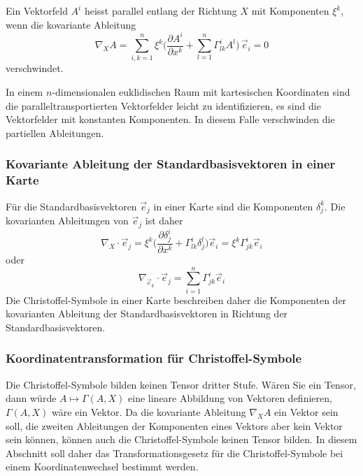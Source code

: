 \begin{definition}
%
%
Ein Vektorfeld $A^i$ heisst parallel entlang der Richtung
$X$ mit Komponenten $\xi^k$, wenn die kovariante Ableitung
\begin{equation*}
\nabla_X A
=
\sum_{i,k=1}^n
\xi^k
\biggl(
\frac{\partial A^i}{\partial x^k}
+
\sum_{l=1}^n
\Gamma^i_{lk} A^l
\biggr)
\,\vec{e}_i
= 0
\end{equation*}
verschwindet.
\end{definition}

In einem $n$-dimensionalen euklidischen Raum mit kartesischen Koordinaten
sind die paralleltransportierten Vektorfelder leicht zu identifizieren,
es sind die Vektorfelder mit konstanten Komponenten.
In diesem Falle verschwinden die partiellen Ableitungen.



%
%
\subsubsection{Kovariante Ableitung der Standardbasisvektoren in einer Karte}
Für die Standardbasisvektoren $\vec{e}_j$ in einer Karte sind die
Komponenten $\delta_j^k$.
Die kovarianten Ableitungen von $\vec{e}_j$ ist daher
\begin{equation}
\nabla_X\cdot \vec{e}_j
=
\xi^k
\biggl(
\frac{\partial \delta_j^i}{\partial x^k}
+
\Gamma^i_{lk}
\delta_j^l
\biggr)
\vec{e}_i
=
\xi^k\Gamma^i_{jk}\vec{e}_i
\label{buch:zusammenhang:paralleltransport:kovabl:eqn:kontravektor}
\end{equation}
oder
\begin{equation}
\nabla_{\vec{e}_k}\cdot \vec{e}_j
=
\sum_{i=1}^n
\Gamma^i_{jk}\vec{e}_i
\label{buch:zusammenhang:paralleltransport:kovabl:eqn:kontrabasis}
\end{equation}
Die Christoffel-Symbole in einer Karte beschreiben daher die Komponenten
der kovarianten Ableitung der Standardbasisvektoren in Richtung
der Standardbasisvektoren.

%
%
\subsubsection{Koordinatentransformation für Christoffel-Symbole}
Die Christoffel-Symbole bilden keinen Tensor dritter Stufe.
Wären Sie ein Tensor, dann würde $A\mapsto \Gamma(A,X)$ eine lineare
Abbildung von Vektoren definieren, $\Gamma(A,X)$ wäre ein Vektor.
Da die kovariante Ableitung $\nabla_XA$ ein Vektor sein soll,
die zweiten Ableitungen der Komponenten eines Vektors aber kein Vektor
sein können, können auch die Christoffel-Symbole keinen Tensor bilden.
In diesem Abschnitt soll daher das Transformationsgesetz für die
Christoffel-Symbole bei einem Koordinatenwechsel bestimmt werden.

